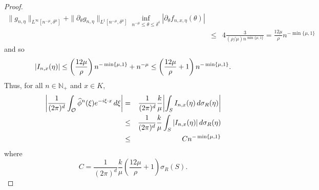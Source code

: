 \documentclass[11pt]{article}
\theoremstyle{remark}
\newcommand{\f}[2]{\frac{#1}{#2}}
\begin{document}
\begin{proof}
\begin{eqnarray*}
{    \|g_{n,\eta}\|_{L^\infty[n^{-\mu},\delta^{\mu}]}
    +
    \|\partial_{\theta}g_{n,\eta}\|_{L^1[n^{-\mu},\delta^{\mu}]}
    }{
    \inf_{n^{-\mu}\leq\theta\leq \delta^{\delta}}|\partial_{\theta}f_{n,x,\eta}(\theta)|
    }\\
    &\leq& 4\frac{3}{(\rho/\mu) n^{\min\{\mu,1\}}}=\frac{12\mu}{\rho}n^{-\min\{\mu,1\}}
\end{eqnarray*}
and so
\begin{equation*}
    \abs{I_{n,x}(\eta)}\leq \left(\frac{12\mu}{\rho}\right)n^{-\min\{\mu,1\}}+n^{-\mu}\leq \left(\frac{12\mu}{\rho}+1\right)n^{-\min\{\mu,1\}}.
\end{equation*}
Thus, for all $n\in\mathbb{N}_+$ and $x\in K$,
\begin{eqnarray*}
\abs{\f{1}{(2\pi)^d}\int_{\mathcal{O}}\widehat{\phi}^n(\xi)e^{-i\xi\cdot x}\,d\xi}
&=&\frac{1}{(2\pi)^d}\f{k}{\mu}\abs{\int_S I_{n,x}(\eta)\,d\sigma_R(\eta)} \\
&\leq& \frac{1}{(2\pi)^d}\f{k}{\mu}\int_S \abs{I_{n,x}(\eta)}\,d\sigma_R(\eta)\\
&\leq& Cn^{-\min\{\mu,1\}}
\end{eqnarray*}
where
\begin{equation*}
    C=\f{1}{(2\pi)^d} \f{k}{\mu} \left(\frac{12\mu}{\rho}+1\right)\sigma_R(S).
\end{equation*}
\end{proof}
\end{document}
